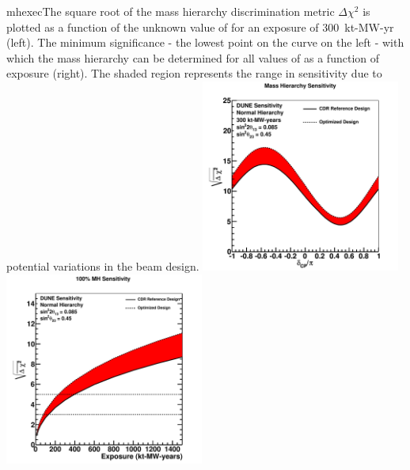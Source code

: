 \begin{cdrfigure}{mhexec}{The
    square root of the mass hierarchy discrimination metric $\Delta
    \chi^2$ is plotted as a function of the unknown value of \deltacp
    for an exposure of 300~kt-MW-yr (left).  The minimum significance
    - the lowest point on the curve on the left - with which the mass
    hierarchy can be determined for all values of \deltacp as a
    function of exposure (right).  The shaded region represents the
    range in sensitivity due to potential variations in the beam
    design.}
\includegraphics[width=0.49\textwidth]{volume-physics/figures/mh_300ktmwyear}
\includegraphics[width=0.49\textwidth]{volume-physics/figures/mh_exp}
\label{fig:mhexec}
\end{cdrfigure}

